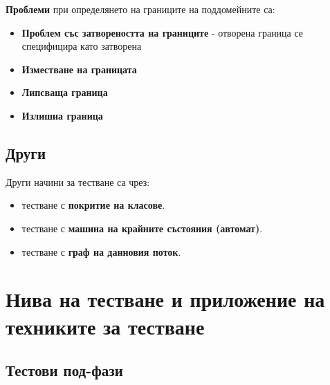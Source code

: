 \documentclass[fleqn,12pt]{article}
\begin{document}
\textbf{Проблеми} при определянето на границите на поддомейните са:
\begin{itemize}
    \item \textbf{Проблем със затвореността на границите} - отворена граница се специфицира като затворена
    \item \textbf{Изместване на границата}
    \item \textbf{Липсваща граница}
    \item \textbf{Излишна граница}
\end{itemize}

\subsection{Други}

Други начини за тестване са чрез:
\begin{itemize}
    \item тестване с \textbf{покритие на класове}.
    \item тестване с \textbf{машина на крайните състояния (автомат)}.
    \item тестване с \textbf{граф на данновия поток}.
\end{itemize}


\section{Нива на тестване и приложение на техниките за тестване}
\subsection{Тестови под-фази}
\end{document}
